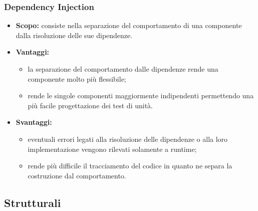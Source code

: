    \subsubsection{Dependency Injection}
     \begin{itemize}
       \item \textbf{Scopo:} consiste nella separazione del comportamento di una componente dalla risoluzione delle sue dipendenze.
	\item \textbf{Vantaggi:}
	  \begin{itemize}
	   \item la separazione del comportamento dalle dipendenze rende una componente molto più flessibile;
	   \item rende le singole componenti maggiormente indipendenti permettendo una più facile progettazione dei test di unità.
	  \end{itemize}
	\item \textbf{Svantaggi:}
	  \begin{itemize}
	   \item eventuali errori legati alla risoluzione delle dipendenze o alla loro implementazione vengono rilevati solamente a runtime;
	   \item rende più difficile il tracciamento del codice in quanto ne separa la costruzione dal comportamento.
	  \end{itemize}
	\end{itemize}
  
  \subsection{Strutturali}
  
